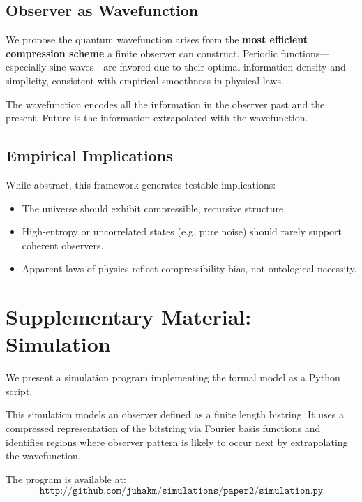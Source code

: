 \documentclass[11pt]{article}
\begin{document}
\subsection{Observer as Wavefunction}

We propose the quantum wavefunction arises from the \textbf{most efficient compression scheme} a finite observer can construct. Periodic functions—especially sine waves—are favored due to their optimal information density and simplicity, consistent with empirical smoothness in physical laws.

The wavefunction encodes all the information in the observer past and the present. Future is the information extrapolated with the wavefunction.


\subsection{Empirical Implications}

While abstract, this framework generates testable implications:

\begin{itemize}
    \item The universe should exhibit compressible, recursive structure.
    \item High-entropy or uncorrelated states (e.g. pure noise) should rarely support coherent observers.
    \item Apparent laws of physics reflect compressibility bias, not ontological necessity.
\end{itemize}


\section{Supplementary Material: Simulation}

We present a simulation program implementing the formal model as a Python script.

This simulation models an observer defined as a finite length bistring. It uses a compressed representation of the bitstring via Fourier basis functions and identifies regions where observer pattern is likely to occur next by extrapolating the wavefunction.


The program is available at:
\[
    \texttt{http://github.com/juhakm/simulations/paper2/simulation.py}
\]
\end{document}
